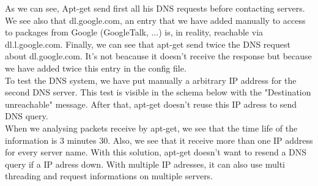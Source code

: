 \documentclass[twoside]{article}
\begin{document}
\begin{multicols}{2}
As we can see, Apt-get send first all his DNS requests before contacting servers.  We see also that dl.google.com, an entry that we have added manually to access to packages from Google (GoogleTalk, ...) is, in reality, reachable via dl.l.google.com.  Finally, we can see that apt-get send twice the DNS request about dl.google.com.  It's not beacause it doesn't receive the response but because we have added twice this entry in the config file.\\
To test the DNS system, we have put manually a arbitrary IP address for the second DNS server.  This test is visible in the schema below with the "Destination unreachable" message.  After that, apt-get doesn't reuse this IP adress to send DNS query.\\
When we analysing packets receive by apt-get, we see that the time life of the information is 3 minutes 30.  Also, we see that it receive more than one IP address for every server name.  With this solution, apt-get doesn't want  to resend a DNS query if a IP adress down.  With multiple IP adresses, it can also  use multi threading and request informations on multiple servers.\\

\end{multicols}
\end{document}
